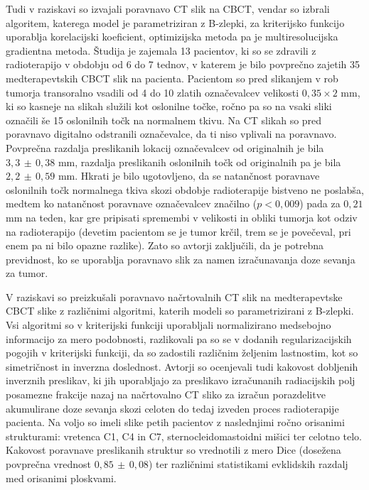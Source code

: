 \documentclass[journal]{IEEEtran}
\begin{document}
Tudi v raziskavi \cite{mencarelli2014} so izvajali poravnavo CT slik na CBCT, vendar so izbrali algoritem, katerega model je parametriziran z B-zlepki, za kriterijsko funkcijo uporablja korelacijski koeficient, optimizijska metoda pa je multiresolucijska gradientna metoda. Študija je zajemala 13 pacientov, ki so se zdravili z radioterapijo v obdobju od 6 do 7 tednov, v katerem je bilo povprečno zajetih 35 medterapevtskih CBCT slik na pacienta. Pacientom so pred slikanjem v rob tumorja transoralno vsadili od 4 do 10 zlatih označevalcev velikosti $0{,}35\times 2$ mm, ki so kasneje na slikah služili kot oslonilne točke, ročno pa so na vsaki sliki označili še 15 oslonilnih točk na normalnem tkivu. Na CT slikah so pred poravnavo digitalno odstranili označevalce, da ti niso vplivali na poravnavo. Povprečna razdalja preslikanih lokacij označevalcev od originalnih je bila $3{,}3\,\pm\,0{,}38$ mm, razdalja preslikanih oslonilnih točk od originalnih pa je bila $2{,}2\,\pm\,0{,}59$ mm. Hkrati je bilo ugotovljeno, da se natančnost poravnave oslonilnih točk normalnega tkiva skozi obdobje radioterapije bistveno ne poslabša, medtem ko natančnost poravnave označevalcev značilno ($p<0{,}009$) pada za $0{,}21$ mm na teden, kar gre pripisati spremembi v velikosti in obliki tumorja kot odziv na radioterapijo (devetim pacientom se je tumor krčil, trem se je povečeval, pri enem pa ni bilo opazne razlike). Zato so avtorji zaključili, da je potrebna previdnost, ko se uporablja poravnavo slik za namen izračunavanja doze sevanja za tumor.

V raziskavi \cite{veiga2015} so preizkušali poravnavo načrtovalnih CT slik na medterapevtske CBCT slike z različnimi algoritmi, katerih modeli so parametrizirani z B-zlepki. Vsi algoritmi so v kriterijski funkciji uporabljali normalizirano medsebojno informacijo za mero podobnosti, razlikovali pa so se v dodanih regularizacijskih pogojih v kriterijski funkciji, da so zadostili različnim željenim lastnostim, kot so simetričnost in inverzna doslednost. Avtorji so ocenjevali tudi kakovost dobljenih inverznih preslikav, ki jih uporabljajo za preslikavo izračunanih radiacijskih polj posamezne frakcije nazaj na načrtovalno CT sliko za izračun porazdelitve akumulirane doze sevanja skozi celoten do tedaj izveden proces radioterapije pacienta. Na voljo so imeli slike petih pacientov z naslednjimi ročno orisanimi strukturami: vretenca C1, C4 in C7, sternocleidomastoidni mišici ter celotno telo. Kakovost poravnave preslikanih struktur so vrednotili z mero Dice (dosežena povprečna vrednost $0{,}85\,\pm\,0{,}08$) ter različnimi statistikami evklidskih razdalj med orisanimi ploskvami.
\end{document}
